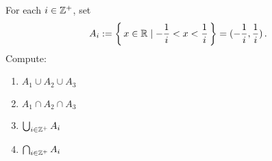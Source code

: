 \guard




\begin{exmp}
\label{exmp:setOperationsForSequencesOfSets}
  For each $i\in\mathbb{Z}^{+}$, set \[ A_i:=\left\{\, x\in\mathbb{R}\mid -\frac{1}{i}<x<\frac{1}{i}\,\right\} = (-\frac{1}{i},\frac{1}{i})\,.\]
  Compute:
  \begin{enumerate}
    \item $A_1 \cup A_2 \cup A_3 $

    \item $A_1 \cap A_2 \cap A_3 $

    \item $\bigcup_{i\in\mathbb{Z}^+} A_i$

    \item $\bigcap_{i\in\mathbb{Z}^+} A_i$
  \end{enumerate}
\end{exmp}
